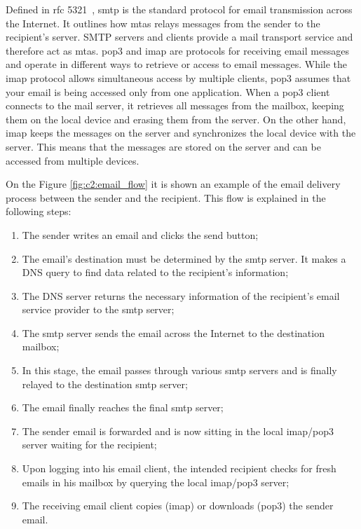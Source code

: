 Defined in \ac{rfc} 5321~\cite{rfc5321}, \ac{smtp} is the standard protocol for email transmission across the Internet. It outlines how \ac{mtas} relays messages from the sender to the recipient's server. SMTP servers and clients provide a mail transport service and therefore act as \ac{mtas}. \ac{pop3} and \ac{imap} are protocols for receiving email messages and operate in different ways to retrieve or access to email messages. While the \ac{imap} protocol allows simultaneous access by multiple clients, \ac{pop3} assumes that your email is being accessed only from one application. When a \ac{pop3} client connects to the mail server, it retrieves all messages from the mailbox, keeping them on the local device and erasing them from the server. On the other hand, \ac{imap} keeps the messages on the server and synchronizes the local device with the server. This means that the messages are stored on the server and can be accessed from multiple devices.


On the Figure \ref{fig:c2:email_flow} it is shown an example of the email delivery process between the sender and the recipient. This flow is explained in the following steps:
\begin{enumerate}
    \item The sender writes an email and clicks the send button;
    \item The email's destination must be determined by the \ac{smtp} server. It makes a DNS query to find data related to the recipient's information;
    \item The DNS server returns the necessary information of the recipient's email service provider to the \ac{smtp} server;
    \item The \ac{smtp} server sends the email across the Internet to the destination mailbox;
    \item In this stage, the email passes through various \ac{smtp} servers and is finally relayed to the destination \ac{smtp} server; 
    \item The email finally reaches the final \ac{smtp} server;
    \item The sender email is forwarded and is now sitting in the local \ac{imap}/\ac{pop3} server waiting for the recipient;
    \item Upon logging into his email client, the intended recipient checks for fresh emails in his mailbox by querying the local \ac{imap}/\ac{pop3} server;
    \item The receiving email client copies (\ac{imap}) or downloads (\ac{pop3}) the sender email. 
\end{enumerate}

